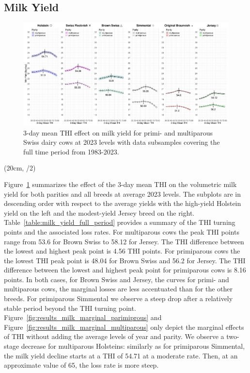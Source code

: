 \begin{landscape} %
    \thispagestyle{empty}
\section{Milk Yield}\label{sec:milk_yiled}
\begin{figure}[H]
        \centering
        \includegraphics[width=0.85\paperheight]{thesis/figures/results/milk_yield.png}
    
    \caption{3-day mean THI effect on milk yield for primi- and multiparous Swiss dairy cows at 2023 levels with data subsamples covering the full time period from 1983-2023.}
    \label{fig:results_milk_yield}
\end{figure}
\begin{textblock*}{2cm}(20cm, \dimexpr\paperheight/2)
\end{textblock*}
\end{landscape}
\newpage
Figure~\ref{fig:results_milk_yield} summarizes the effect of the 3-day mean THI on the volumetric milk yield for both parities and all breeds at average 2023 levels. The subplots are in descending order with respect to the average yields with the high-yield Holstein yield on the left and the modest-yield Jersey breed on the right. Table~\ref{table:milk_yield_full_period} provides a summary of the THI turning points and the associated loss rates. For multiparous cows the peak THI points range from 53.6 for Brown Swiss to 58.12 for Jersey. The THI difference between the lowest and highest peak point is 4.56 THI points. For primiparous cows the the lowest THI peak point is 48.04 for Brown Swiss and 56.2 for Jersey. The THI difference between the lowest and highest peak point for primiparous cows is 8.16 points. In both cases, for Brown Swiss and Jersey, the curves for primi- and multiparous cows, the marginal losses are less accentuated than for the other breeds. For primiparous Simmental we observe a steep drop after a relatively stable period beyond the THI turning point. Figure~\ref{fig:results_milk_marginal_parimiprous} and Figure~\ref{fig:results_milk_marginal_multiparous} only depict the marginal effects of THI without adding the average levels of year and parity. We observe a two-stage decrease for multiparous Holsteins: similarly as for primiparous Simmental, the milk yield decline starts at a THI of 54.71 at a moderate rate. Then, at an approximate value of 65, the loss rate is more steep.

